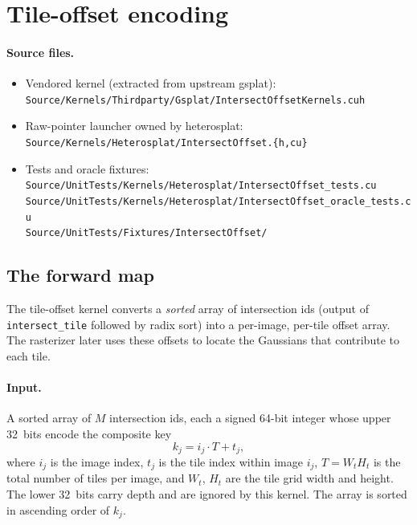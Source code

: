 \documentclass[11pt]{article}
\begin{document}
\section{Tile-offset encoding}
\label{sec:intersect-offset}

\paragraph{Source files.}
\begin{itemize}
  \item Vendored kernel (extracted from upstream gsplat):\\
  \texttt{Source/Kernels/Thirdparty/Gsplat/IntersectOffsetKernels.cuh}
  \item Raw-pointer launcher owned by heterosplat:\\
  \texttt{Source/Kernels/Heterosplat/IntersectOffset.\{h,cu\}}
  \item Tests and oracle fixtures:\\
  \texttt{Source/UnitTests/Kernels/Heterosplat/IntersectOffset\_tests.cu}\\
  \texttt{Source/UnitTests/Kernels/Heterosplat/IntersectOffset\_oracle\_tests.cu}\\
  \texttt{Source/UnitTests/Fixtures/IntersectOffset/}
\end{itemize}

\subsection{The forward map}

The tile-offset kernel converts a \emph{sorted} array of intersection
ids (output of \texttt{intersect\_tile} followed by radix sort) into a
per-image, per-tile offset array. The rasterizer later uses these
offsets to locate the Gaussians that contribute to each tile.

\paragraph{Input.}
A sorted array of $M$ intersection ids, each a signed 64-bit integer
whose upper 32~bits encode the composite key
\[
  k_j = i_j \cdot T + t_j,
\]
where $i_j$ is the image index, $t_j$ is the tile index within image
$i_j$, $T = W_t H_t$ is the total number of tiles per image, and
$W_t$, $H_t$ are the tile grid width and height. The lower 32~bits
carry depth and are ignored by this kernel. The array is sorted in
ascending order of $k_j$.
\end{document}
